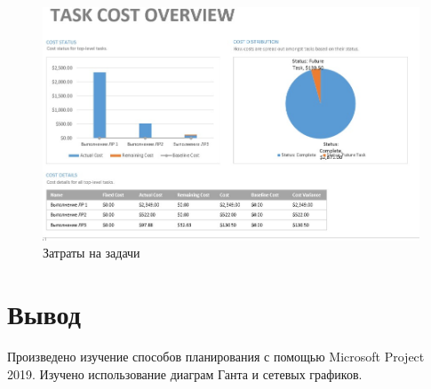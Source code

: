 \documentclass[a4paper, 14pt]{extarticle}
\begin{document}
\begin{enumerate}
    \begin{figure}[h]
        \centering
        \includegraphics[width=\textwidth]{img/S009.jpg}
        \caption{Затраты на задачи}%
        \label{img:report:task_cost}
    \end{figure}

\end{enumerate}

\section{Вывод}
Произведено изучение способов планирования с помощью Microsoft Project 2019. Изучено использование диаграм Ганта и сетевых графиков.

\printbibliography{}

\StartAddons{}

\newpage
{}

\end{document}
